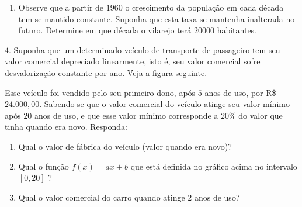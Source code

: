\begin{enumerate}
\item {} 
Observe que a partir de \(1960\) o crescimento da população em cada década tem se mantido constante. Suponha que esta taxa se mantenha inalterada no futuro. Determine em que década o vilarejo terá \(20 000\) habitantes.

\end{enumerate}

\(4.\) Suponha que um determinado veículo de transporte de passageiro tem seu valor comercial depreciado linearmente, isto é, seu valor comercial sofre desvalorização constante por ano. Veja a figura seguinte.
\begin{center}\end{center}
Esse veículo foi vendido pelo seu primeiro dono, após \(5\) anos de uso, por R\$ \(24.000,00\). Sabendo-se que o valor comercial do veículo atinge seu valor mínimo após \(20\) anos de uso, e que esse valor mínimo corresponde a \(20\%\) do valor que tinha quando era novo. Responda:
\begin{enumerate}
\item {} 
Qual o valor de fábrica do veículo (valor quando era novo)?

\item {} 
Qual o função \(f(x)=ax+b\) que está definida no gráfico acima no intervalo \([0,20]\) ?

\item {} 
Qual o valor comercial do carro quando atinge \(2\) anos de uso?

\end{enumerate}

